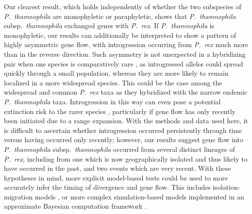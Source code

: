 \documentclass[12pt,letterpaper]{article}
\begin{document}
Our clearest result, which holds independently of whether the two
subspecies of \emph{P.~thamnophila} are monophyletic or paraphyletic,
shows that \emph{P.~thamnophila} subsp.\ \emph{thamnophila} exchanged
genes with \emph{P.~rex}. If \emph{P.~thamnophila} is monophyletic,
our results can additionally be interpreted to show a pattern of
highly asymmetric gene flow, with introgression occurring from
\emph{P.~rex} much more than in the reverse direction. Such asymmetry
is not unexpected in a hybridizing pair when one species is
comparatively rare \citep{levin_hybridization_1996}, as introgressed
alleles could spread quickly through a small population, whereas they
are more likely to remain localized in a more widespread species.
This could be the case among the widespread and common \emph{P.~rex}
taxa as they hybridized with the narrow endemic \emph{P.~thamnophila}
taxa. %
Introgression in this way can even pose a potential extinction risk to
the rarer species \citep{ghosh_quantifying_2012}, particularly if gene
flow has only recently been initiated due to a range expansion.  With
the methods and data used here, it is difficult to ascertain whether
introgression occurred persistently through time versus having
occurred only recently; however, our results suggest gene flow into
\emph{P.~thamnophila} subsp.\ \emph{thamnophila} occurred from several
distinct lineages of \emph{P.~rex}, including from one which is now
geographically isolated and thus likely to have occurred in the past,
and two events which are very recent. With these hypotheses in mind,
more explicit model-based tests could be used to more accurately infer
the timing of divergence and gene flow.  This includes
isolation-migration models \citep[e.g., IMa2;][]{hey_isolation_2010},
or more complex simulation-based models implemented in an approximate
Bayesian computation framework \citep{beaumont_approximate_2010}.
\end{document}
